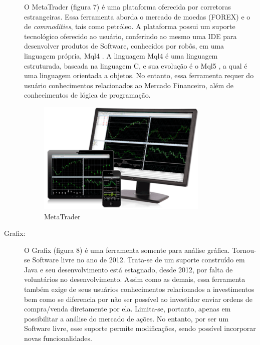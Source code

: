 \begin{description}
O MetaTrader (figura 7) é uma plataforma oferecida por corretoras estrangeiras. Essa ferramenta aborda o mercado de moedas (FOREX) e o de \textit{commodities}, tais como petróleo. A plataforma possui um suporte tecnológico oferecido ao usuário, conferindo ao mesmo uma IDE para desenvolver produtos de Software, conhecidos por robôs, em uma linguagem própria, Mql4 \cite{kovalyov2006}. A linguagem Mql4 é uma linguagem estruturada, baseada na linguagem C, e sua evolução é o Mql5 \cite{metaquotes2014}, a qual é uma linguagem orientada a objetos. No entanto, essa ferramenta requer do usuário conhecimentos relacionados ao Mercado Financeiro, além de conhecimentos de lógica de programação.

\begin{figure}[h!]
\centering
\label{f04}
\includegraphics[width=0.8\textwidth]{figuras/f04}
\caption{MetaTrader}
\end{figure}
\FloatBarrier


\item[Grafix:]

O Grafix (figura 8) é uma ferramenta somente para análise gráfica. Tornou-se Software livre no ano de 2012. Trata-se de um suporte construído em Java e seu desenvolvimento está estagnado, desde 2012, por falta de voluntários no desenvolvimento. Assim como as demais, essa ferramenta também exige de seus usuários conhecimentos relacionados a investimentos bem como se diferencia por não ser possível ao investidor enviar ordens de compra/venda diretamente por ela. Limita-se, portanto, apenas em possibilitar a análise do mercado de ações. No entanto, por ser um Software livre, esse suporte permite modificações, sendo possível incorporar novas funcionalidades.


\end{description}

